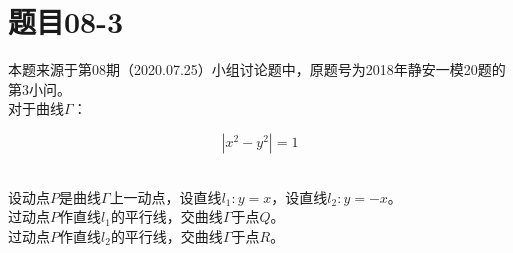 \documentclass[UTF8]{ctexart}
\begin{document}
\section{题目08-3}
    本题来源于第08期（2020.07.25）小组讨论题中，原题号为2018年静安一模20题的第3小问。\\[3mm]
    对于曲线$\Gamma$：
    \begin{large}
        \begin{equation*}
            \left|x^2-y^2\right|=1
        \end{equation*}
    \end{large}\\
    设动点$P$是曲线$\Gamma$上一动点，设直线$l_1:y=x$，设直线$l_2:y=-x$。\\[3mm]
    过动点$P$作直线$l_1$的平行线，交曲线$\Gamma$于点$Q$。\\[3mm]
    过动点$P$作直线$l_2$的平行线，交曲线$\Gamma$于点$R$。\\[3mm]
\end{document}
